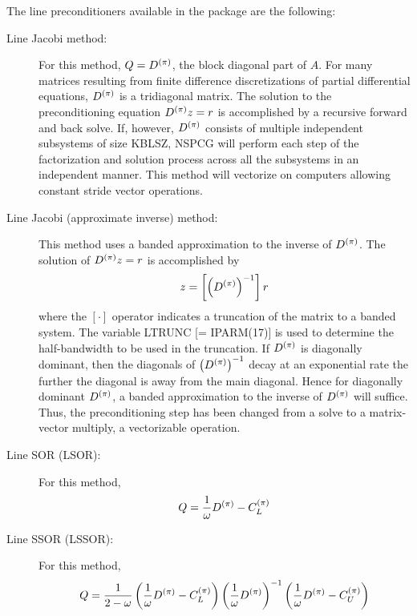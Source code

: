    The line preconditioners available in the package are the
following:
\bigskip
\begin{description}
\item[Line Jacobi method:]
      For this method, $Q=D^{(\pi)}$, the block diagonal part 
      of $A$.  For many matrices resulting from finite difference
      discretizations of partial differential equations,
      $D^{(\pi)}$ is a tridiagonal matrix.  The solution to the
      preconditioning equation $D^{(\pi)} z = r$
      is accomplished by a recursive forward and back solve.
      If, however, $D^{(\pi)}$ consists of multiple independent
      subsystems of size KBLSZ, NSPCG will perform each step
      of the factorization and solution process across all
      the subsystems in an independent manner.  This method
      will vectorize on computers allowing constant stride
      vector operations.
 
\item[Line Jacobi (approximate inverse) method:]
      This method uses a banded approximation to the inverse of
      $D^{(\pi)}$.  The solution of $D^{(\pi)} z=r$ is accomplished by
      \[
                  z = \left[ \left( D^{(\pi)}\right)^{-1}\right] r
      \]
      where the $[\cdot ]$ operator indicates a truncation of the
      matrix to a banded system.  The variable LTRUNC [= IPARM(17)]
      is used to determine the half-bandwidth to be used
      in the truncation.  If $D^{(\pi)}$ is diagonally dominant, then
      the diagonals of $\left( D^{(\pi)} \right) ^{-1}$ decay at an exponential 
      rate the further the diagonal is away from the main diagonal.
      Hence for diagonally dominant $D^{(\pi)}$, a banded approximation
      to the inverse of $D^{(\pi)}$ will suffice.  Thus, the 
      preconditioning step has been changed from a solve to a 
      matrix-vector multiply, a vectorizable operation.
 
\item[Line SOR (LSOR):]
      For this method, 
      \[  Q=\frac{1}{\omega} D^{(\pi)}-C_L^{(\pi)} \]
 
\item[Line SSOR (LSSOR):]
      For this method,
      \[ Q = \frac{1}{2-\omega}
          \left( \frac{1}{\omega} D^{(\pi)} - C_L^{(\pi)} \right) \left( \frac{1}{\omega} D^{(\pi)} \right) ^{-1}
          \left( \frac{1}{\omega} D^{(\pi)} - C_U^{(\pi)} \right) \]
 

\end{description}
